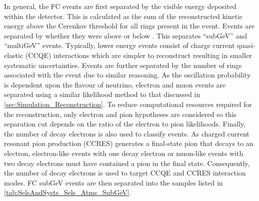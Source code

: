 In general, the FC events are first separated by the visible energy deposited within the detector. This is calculated as the sum of the reconstructed kinetic energy above the Cerenkov threshold for all rings present in the event. Events are separated by whether they were above or below . This separates ``subGeV'' and ``multiGeV'' events. Typically, lower energy events consist of charge current quasi-elastic (CCQE) interactions which are simpler to reconstruct resulting in smaller systematic uncertainties. Events are further separated by the number of rings associated with the event due to similar reasoning. As the oscillation probability is dependent upon the flavour of neutrino, electron and muon events are separated using a similar likelihood method to that discussed in \autoref{sec:Simulation_Reconstruction}. To reduce computational resources required for the reconstruction, only electron and pion hypotheses are considered so this separation cut depends on the ratio of the electron to pion likelihoods. Finally, the number of decay electrons is also used to classify events. As charged current resonant pion production (CCRES) generates a final-state pion that decays to an electron, electron-like events with one decay electron or muon-like events with two decay electrons must have contained a pion in the final state. Consequently, the number of decay electrons is used to target CCQE and CCRES interaction modes. FC subGeV events are then separated into the samples listed in \autoref{tab:SelsAndSysts_Sels_Atms_SubGeV}.

